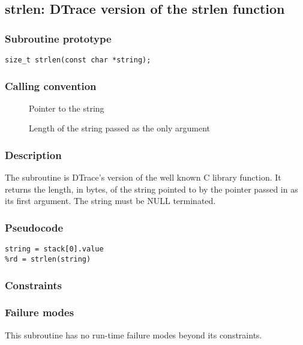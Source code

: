 \clearpage
{}
{}
\label{subr:strlen}
\subsection*{strlen: DTrace version of the strlen function}

\subsubsection*{Subroutine prototype}

\begin{verbatim}
size_t strlen(const char *string);
\end{verbatim}

\subsubsection*{Calling convention}

\begin{description}
\item[] Pointer to the string
\item[] Length of the string passed as the only argument
\end{description}

\subsubsection*{Description}

The  subroutine is DTrace's version of the well
known C library function.  It returns the length, in bytes, of the string
pointed to by the pointer passed in as its first argument. The string must be
NULL terminated.

\subsubsection*{Pseudocode}

\begin{verbatim}
string = stack[0].value
%rd = strlen(string)
\end{verbatim}

\subsubsection*{Constraints}

\subsubsection*{Failure modes}

This subroutine has no run-time failure modes beyond its constraints.
